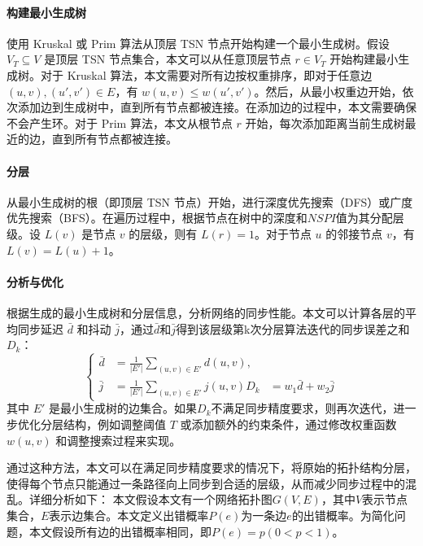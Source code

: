 \documentclass[UTF8,a4paper,12pt]{ctexart}
\numberwithin{equation}{section}
\begin{document}
\paragraph{构建最小生成树}使用 Kruskal 或 Prim 算法从顶层 TSN 节点开始构建一个最小生成树。假设 $V_T \subseteq V$ 是顶层 TSN 节点集合，本文可以从任意顶层节点 $r \in V_T$ 开始构建最小生成树。对于 Kruskal 算法，本文需要对所有边按权重排序，即对于任意边 $(u, v), (u', v') \in E$，有 $w(u, v) \le w(u', v')$。然后，从最小权重边开始，依次添加边到生成树中，直到所有节点都被连接。在添加边的过程中，本文需要确保不会产生环。对于 Prim 算法，本文从根节点 $r$ 开始，每次添加距离当前生成树最近的边，直到所有节点都被连接。

\paragraph{分层}从最小生成树的根（即顶层 TSN 节点）开始，进行深度优先搜索（DFS）或广度优先搜索（BFS）。在遍历过程中，根据节点在树中的深度和$NSPI$值为其分配层级。设 $L(v)$ 是节点 $v$ 的层级，则有 $L(r) = 1$。对于节点 $u$ 的邻接节点 $v$，有 $L(v) = L(u) + 1$。

\paragraph{分析与优化}根据生成的最小生成树和分层信息，分析网络的同步性能。本文可以计算各层的平均同步延迟 $\bar{d}$ 和抖动 $\bar{j}$，通过$\bar{d}$和$\bar{j}$得到该层级第k次分层算法迭代的同步误差之和$D_k$：
\begin{equation}
	\left\{
	\begin{aligned}
			\bar{d} &= \frac{1}{\lvert E' \rvert} \sum_{(u,v) \in E'} d(u,v),\\
		\bar{j} &= \frac{1}{\lvert E' \rvert} \sum_{(u,v) \in E'} j(u,v)
		D_k &= w_1 \bar{d} + w_2 \bar{j}
	\end{aligned}
	\right.
\end{equation}
其中 $E'$ 是最小生成树的边集合。如果$D_k$不满足同步精度要求，则再次迭代，进一步优化分层结构，例如调整阈值 $T$ 或添加额外的约束条件，通过修改权重函数 $w(u, v)$ 和调整搜索过程来实现。

通过这种方法，本文可以在满足同步精度要求的情况下，将原始的拓扑结构分层，使得每个节点只能通过一条路径向上同步到合适的层级，从而减少同步过程中的混乱。详细分析如下：
本文假设本文有一个网络拓扑图$G(V, E)$，其中$V$表示节点集合，$E$表示边集合。本文定义出错概率$P(e)$为一条边$e$的出错概率。为简化问题，本文假设所有边的出错概率相同，即$P(e) = p (0 < p < 1)$。
\end{document}
